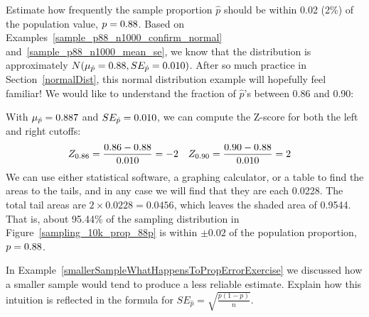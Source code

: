 \begin{examplewrap}
\begin{nexample}{Estimate how frequently the sample proportion
$\hat{p}$ should be within 0.02 (2\%) of the population value,
$p = 0.88{}$. Based on
Examples~\ref{sample_p88_n1000_confirm_normal}
and~\ref{sample_p88_n1000_mean_se},
we know that the distribution is approximately
$N(\mu_{\hat{p}} = 0.88{}, SE_{\hat{p}} = 0.010{})$.}
\label{sampling_10k_prop_887p-prop_from_867_to_907}
After so much practice in Section~\ref{normalDist},
this normal distribution example will hopefully feel familiar!
We would like to understand the fraction of $\hat{p}$'s
between 0.86 and 0.90:
\begin{center}
\end{center}
With $\mu_{\hat{p}} = 0.887{}$ and
$SE_{\hat{p}} = 0.010{}$,
we can compute the Z-score for both the left and right cutoffs:
\begin{align*}
Z_{0.86}
  &= \frac{0.86 - 0.88{}}{0.010{}}
  = -2
&Z_{0.90}
  &= \frac{0.90 - 0.88{}}{0.010{}}
  = 2
\end{align*}
We can use either statistical software, a graphing calculator,
or a table to find the areas to the tails, and in any case we
will find that they are each 0.0228. The total tail areas are
$2 \times 0.0228 = 0.0456$, which leaves the shaded area of
0.9544. That is, about 95.44\% of the sampling distribution
in Figure~\ref{sampling_10k_prop_88p} is within $\pm0.02$
of the population proportion, $p = 0.88{}$.
\end{nexample}
\end{examplewrap}

\begin{exercisewrap}
\begin{nexercise}
In Example~\ref{smallerSampleWhatHappensToPropErrorExercise}
we discussed how a smaller sample would tend
to produce a less reliable estimate. Explain how this intuition
is reflected in the formula for
$SE_{\hat{p}} = \sqrt{\frac{p (1 - p)}{n}}$.\footnotemark
\end{nexercise}
\end{exercisewrap}


